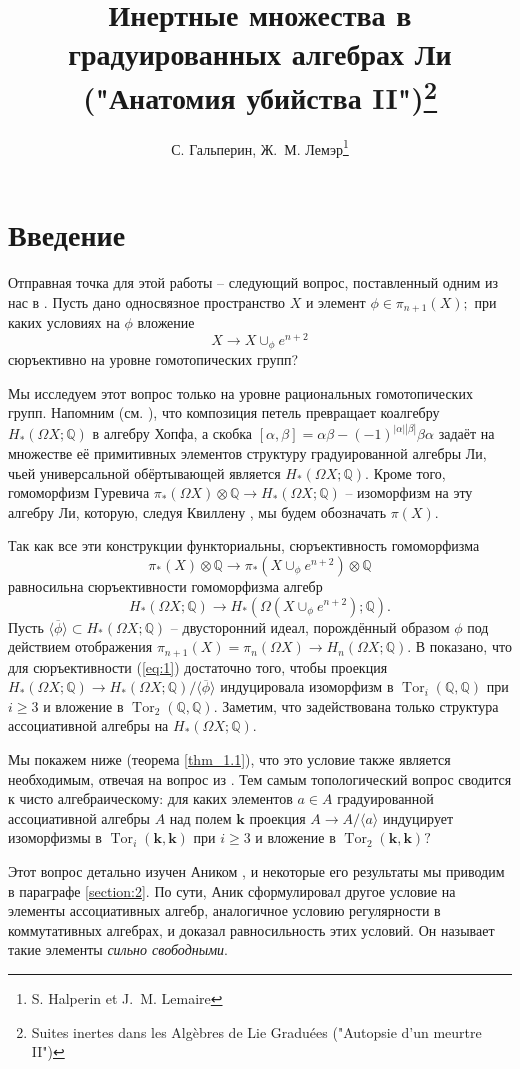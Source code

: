 \documentclass[10pt,a4paper]{article}
\author{С. Гальперин, Ж.~М. Лемэр\thanks{S. Halperin et J.~M. Lemaire}}
\title{Инертные множества в градуированных алгебрах Ли\\ ("Анатомия убийства II")\thanks{Suites inertes dans les Alg\`ebres de Lie Gradu\'ees ("Autopsie d'un meurtre II")}}
\date{}
\DeclareMathOperator{\Tor}{Tor}
\def\QQ{\mathbb{Q}}
\def\k{\mathbf{k}}
\def\OX{{\Omega X}}
\theoremstyle{definition}
\begin{document}
\maketitle
\section*{Введение}
Отправная точка для этой работы -- следующий вопрос, поставленный одним из нас в \cite{15}. Пусть дано односвязное пространство $X$ и элемент $\phi\in\pi_{n+1}(X);$ при каких условиях на $\phi$ вложение
$$X\to X\cup_\phi e^{n+2}$$ сюръективно на уровне гомотопических групп?

Мы исследуем этот вопрос только на уровне рациональных гомотопических групп. Напомним (см. \cite{16}), что композиция петель превращает коалгебру $H_*(\OX;\QQ)$ в алгебру Хопфа, а скобка $[\alpha,\beta]=\alpha\beta-(-1)^{|\alpha||\beta|}\beta\alpha$ задаёт на множестве её примитивных элементов структуру градуированной алгебры Ли, чьей универсальной обёртывающей является $H_*(\OX;\QQ).$ Кроме того, гомоморфизм Гуревича $\pi_*(\OX)\otimes\QQ\to H_*(\OX;\QQ)$ -- изоморфизм на эту алгебру Ли, которую, следуя Квиллену \cite{18}, мы будем обозначать $\pi(X).$

Так как все эти конструкции функториальны, сюръективность гомоморфизма
$$\pi_*(X)\otimes\QQ\to \pi_*(X\cup_\phi e^{n+2})\otimes\QQ$$ равносильна сюръективности гомоморфизма алгебр
\begin{equation}\label{eq:1}
H_*(\OX;\QQ)\to H_*(\Omega(X\cup_\phi e^{n+2});\QQ).
\end{equation}
Пусть $\langle\overline{\phi}\rangle\subset H_*(\OX;\QQ)$ -- двусторонний идеал, порождённый образом $\phi$ под действием отображения $\pi_{n+1}(X)=\pi_n(\OX)\to H_n(\OX;\QQ).$ В \cite{15} показано, что для сюръективности (\ref{eq:1})  достаточно того, чтобы проекция $H_*(\OX;\QQ)\to H_*(\OX;\QQ)/\langle \overline{\phi}\rangle$ индуцировала изоморфизм в $\Tor_i(\QQ,\QQ)$ при $i\ge 3$ и вложение в $\Tor_2(\QQ,\QQ).$ Заметим, что задействована только структура ассоциативной алгебры на $H_*(\OX;\QQ).$

Мы покажем ниже (теорема \ref{thm_1.1}), что это условие также является необходимым, отвечая на вопрос из \cite{15}. Тем самым топологический вопрос сводится к чисто алгебраическому: для каких элементов $a\in A$ градуированной ассоциативной алгебры $A$ над полем $\k$ проекция $A\to A/\langle a\rangle$ индуцирует изоморфизмы в $\Tor_i(\k,\k)$ при $i\geq 3$ и вложение в $\Tor_2(\k,\k)?$

Этот вопрос детально изучен Аником \cite{2}, и некоторые его результаты мы приводим в параграфе \ref{section:2}. По сути, Аник сформулировал другое условие на элементы ассоциативных алгебр, аналогичное условию регулярности в коммутативных алгебрах, и доказал равносильность этих условий. Он называет такие элементы \emph{сильно свободными}.
\end{document}
